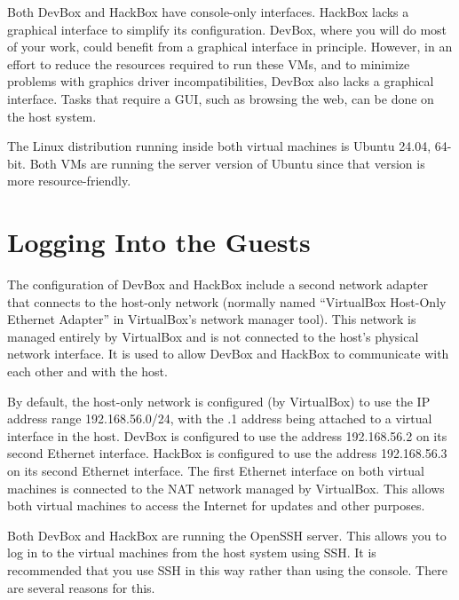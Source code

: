 \documentclass{article}
\begin{document}
Both DevBox and HackBox have console-only interfaces. HackBox lacks a graphical interface to
simplify its configuration. DevBox, where you will do most of your work, could benefit from a
graphical interface in principle. However, in an effort to reduce the resources required to run
these VMs, and to minimize problems with graphics driver incompatibilities, DevBox also lacks a
graphical interface. Tasks that require a GUI, such as browsing the web, can be done on the host
system.

The Linux distribution running inside both virtual machines is Ubuntu 24.04, 64-bit. Both VMs
are running the server version of Ubuntu since that version is more resource-friendly.

\section{Logging Into the Guests}
\label{sec:logging-in}

The configuration of DevBox and HackBox include a second network adapter that connects to the
host-only network (normally named ``VirtualBox Host-Only Ethernet Adapter'' in VirtualBox's
network manager tool). This network is managed entirely by VirtualBox and is not connected to
the host's physical network interface. It is used to allow DevBox and HackBox to communicate
with each other and with the host.

By default, the host-only network is configured (by VirtualBox) to use the IP address range
192.168.56.0/24, with the .1 address being attached to a virtual interface in the host. DevBox
is configured to use the address 192.168.56.2 on its second Ethernet interface. HackBox is
configured to use the address 192.168.56.3 on its second Ethernet interface. The first Ethernet
interface on both virtual machines is connected to the NAT network managed by VirtualBox. This
allows both virtual machines to access the Internet for updates and other purposes.

Both DevBox and HackBox are running the OpenSSH server. This allows you to log in to the virtual
machines from the host system using SSH. It is recommended that you use SSH in this way rather
than using the console. There are several reasons for this.
\end{document}
